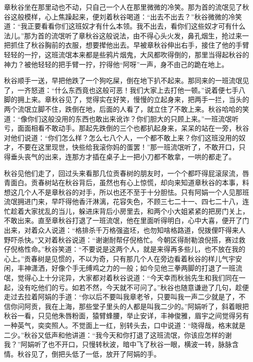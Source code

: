 \documentclass[12pt,UTF8]{ctexbook}
\begin{document}
{{{章秋谷坐在那里动也不动，只自己一个人在那里微微的冷笑。那为首的流氓见了秋谷这般模样，心上焦躁起来，便刘着秋谷喝道：“出去不出去？”秋谷微微的冷笑道：“我正要看看你们这班奴才有什么本领。我不出去，看你们这些奴才可有什么法儿。”那为首的流氓听了章秋谷这般说法，由不得心头火发，鼻孔烟生，抢过来一把抓住了秋谷胸前的衣服，想要撵他出去。早被章秋谷伸出右手，接住了他的手臂轻轻的一拧，这班流氓本来都是些鸦片烟鬼，大风都吹得倒的，那里当得起秋谷的神力？被他轻轻的把手臂一拧，拧得他“阿呀”一声，身不由己的跪在地上。

秋谷顺手一送，早把他跌了一个狗吃屎，倒在地下扒不起来。那同来的一班流氓见了，一齐怒道：“什么东西竟也这般可恶！我们大家上去打他一顿。”说着便七手八脚的拥上来。章秋谷见了，觉得实在好笑，慢慢的立起身来，把两手一拦，当头的两个流氓立脚不住，跌倒在地，后面的人看了，就立住了不敢上来。秋谷哈哈的笑道：“像你们这般没用的东西也敢出来讹诈？你们胆大的只顾上来。”一班流氓听亏，面面相看不敢动手。那起先跌倒的三个也都扒起身来，呆呆的站在一旁，秋谷对他们说道：“你们怎么样？怎么七八个人，一个都不敢上来？你们这班没用的奴才，不要在这里现世，快些给我滚你妈的蛋罢！”那一班流氓听了，不敢开口，只得垂头丧气的出来，连那方才插在桌子上一把小刀都不敢拿，一哄的都走了。

秋谷见他们走了，回过头来看那几位贡春树的朋友时，一个个都吓得屁滚尿流，唇青面白。贡春树站在秋谷背后，虽然也有心上惊慌，却向来知道章秋谷的本事，料想这几个人不是章秋谷的对手，所以也还不至于十分胆怯。只有阿娟一个人见那班流氓拥进门来，早吓得他香汗淋漓，花容失色，不顾三七二十一、四七二十八，连忙趁着大家扰乱的当儿，躲进床背后小房里去，和两个小大姐紧紧的把房门关上，不敢出来。直至章秋谷打退了一班流氓，他在里面听得明白，心中大喜，便开了门出来，对着众人说道：“格排杀千万格强盗坯，也勿知啥格路道，倪拨俚吓得来人野吓杀快。”又对着秋谷说道：“谢谢耐帮仔倪格忙。今朝区得耐勒浪倪搭，赛过救仔倪格性命。”秋谷笑道：“不要说是这两个人，就是来得再多些儿，也不放在我的心上。”贡春树是见惯的，不以为奇，只有那几个人在旁边看着秋谷的样儿气宇安闲，丰神潇洒，好像个手无缚鸡之力的一般；如今见他三拳两脚的打退了一班流氓，觉得心上十分诧异，大家都对着秋谷说道：“今天幸而秋翁先生和我们同在一起，没有吃他们的亏。如若不然，今天就不可问了。”秋谷也随意谦逊了几句，趁便走过去拉着阿娟的手道：“你以后不要叫我章老爷，只要叫我一声二少就是了，不信你问阿贡，我在上海，那些堂子里头的人都是叫我二少的。”阿娟听了，斜着眼把秋谷一看，只见他朱唇粉面，猿臂蜂腰，举止安详，丰神俊雅，眉宇之间觉得另有一种英气，奕奕照人。不觉面上一红，别转头去，口中说道：“晓得哉，格末就是二少。”秋谷又低声和他讲道：“我今天和你打退了这班流氓，你该应怎样的谢我？”阿娟听了也不开口，只慢转秋波，暗中飞了秋谷一眼，横波一转，脉脉含情。秋谷见了，倒把头低了一低，放开了阿娟的手。

}}}
\end{document}
